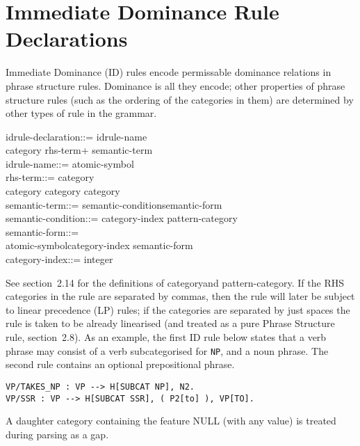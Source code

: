 \section{Immediate Dominance Rule Declarations}

Immediate Dominance (ID) rules encode permissable dominance relations in
phrase structure rules. Dominance is all they encode; other properties of
phrase structure rules (such as the ordering of the categories in them) are
determined by other types of rule in the grammar.
\begin{display}
\la idrule-declaration\ra ::= \la idrule-name\ra \lit{:}\\
\cont \la category\ra \lit{\twodash\ra} \la rhs-term\ran+ \la semantic-term\ran* {}\\
\la idrule-name\ra ::= \la atomic-symbol\ra\\
\la rhs-term\ra ::= \la category\ra \alt\\
\cont \lit{(} \la category\ra \lit{)} \alt \lit{(} \la category\ra \lit{)+} \alt \lit{(} \la category\ra \lit{)*}\\
\la semantic-term\ra ::= \lit{:} \la semantic-condition\ran* \la semantic-form\ra\\
\la semantic-condition\ra ::= \la category-index\ra \lit{=} \la pattern-category\ra \lit{,}\\
\la semantic-form\ra ::=\\
\cont \la atomic-symbol\ra \alt \la category-index\ra \alt \lit{(} \la semantic-form\ran* \lit{)}\\
\la category-index\ra ::= \la integer\ra
\end{display}
See section~2.14 for the definitions of \la category\ra and
\la pattern-category\ran. If the RHS categories in the rule are
separated by commas, then the rule will later
be subject to linear precedence (LP) rules; if the categories are separated
by just spaces the rule is taken to be already linearised (and treated
as a pure Phrase Structure rule, section~2.8).
As an example, the first ID rule below states that a verb
phrase may consist of a verb subcategorised for {\tt NP}, and a noun phrase.
The second rule contains an optional prepositional phrase.
\begin{ex}
\begin{verbatim}
VP/TAKES_NP : VP --> H[SUBCAT NP], N2.
VP/SSR : VP --> H[SUBCAT SSR], ( P2[to] ), VP[TO].
\end{verbatim}
\end{ex}
A daughter category containing the feature NULL (with any value) is treated
during parsing as a gap.

